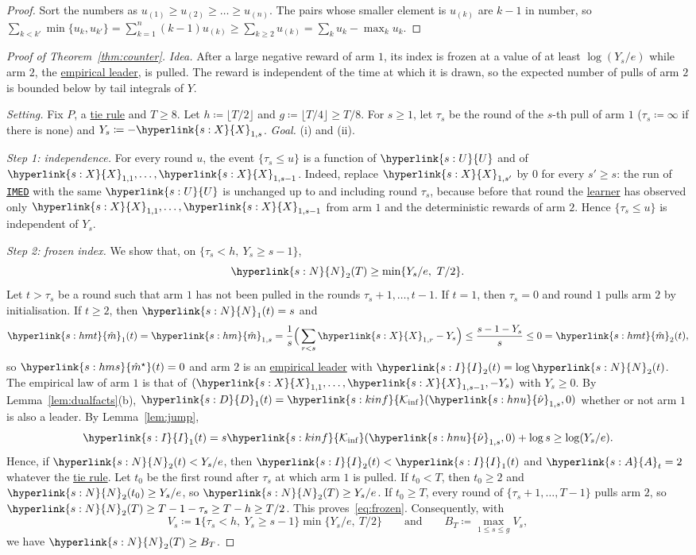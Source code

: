 \documentclass[11pt]{article}
\newcommand{\ind}{\mathbf{1}}
\newcommand{\sy}[2]{{\hyperlink{#1}{#2}}}
\newcommand{\term}[2]{\hyperlink{#1}{#2}}
\newcommand{\imed}{\hyperref[alg:imed]{\texttt{IMED}}}
\newcommand{\Kinf}{\sy{s:kinf}{\mathcal{K}_{\inf}}}
\newcommand{\Xs}{\sy{s:X}{X}}
\newcommand{\Useed}{\sy{s:U}{U}}
\newcommand{\Ap}{\sy{s:A}{A}}
\newcommand{\Np}{\sy{s:N}{N}}
\newcommand{\hnu}{\sy{s:hnu}{\hat{\nu}}}
\newcommand{\hm}{\sy{s:hm}{\hat{m}}}
\newcommand{\hmt}{\sy{s:hmt}{\hat{m}}}
\newcommand{\hms}{\sy{s:hms}{\hat{m}^{\star}}}
\newcommand{\Dv}{\sy{s:D}{D}}
\newcommand{\Ix}{\sy{s:I}{I}}
\begin{document}
\begin{proof}
Sort the numbers as $u_{(1)}\ge u_{(2)}\ge\dots\ge u_{(n)}$. The pairs whose smaller element is
$u_{(k)}$ are $k-1$ in number, so
$\sum_{k<k'}\min\{u_k,u_{k'}\}=\sum_{k=1}^n(k-1)u_{(k)}\ge\sum_{k\ge2}u_{(k)}=\sum_ku_k-\max_ku_k$.
\end{proof}

\begin{proof}[Proof of Theorem~\ref{thm:counter}]
\emph{Idea.} After a large negative reward of arm $1$, its index is frozen at a value of at least
$\log(Y_s/e)$ while arm $2$, the \term{w:leader}{empirical leader}, is pulled. The reward is independent of the
time at which it is drawn, so the expected number of pulls of arm $2$ is bounded below by tail
integrals of $Y$.

\emph{Setting.} Fix $P$, a \term{w:tie}{tie rule} and $T\ge8$. Let $h\coloneqq\lfloor T/2\rfloor$ and
$g\coloneqq\lfloor T/4\rfloor\ge T/8$. For $s\ge1$, let $\tau_s$ be the round of the $s$-th pull of
arm $1$ ($\tau_s\coloneqq\infty$ if there is none) and $Y_s\coloneqq-\Xs_{1,s}$. \emph{Goal.} (i) and (ii).

\emph{Step 1: independence.} For every round $u$, the event $\{\tau_s\le u\}$ is a function of $\Useed$
and of $\Xs_{1,1},\dots,\Xs_{1,s-1}$. Indeed, replace $\Xs_{1,s'}$ by $0$ for every $s'\ge s$: the run of
\imed{} with the same $\Useed$ is unchanged up to and including round $\tau_s$, because before that round
the \term{w:learner}{learner} has observed only $\Xs_{1,1},\dots,\Xs_{1,s-1}$ from arm $1$ and the deterministic rewards
of arm $2$. Hence $\{\tau_s\le u\}$ is independent of $Y_s$.

\emph{Step 2: frozen index.} We show that, on $\{\tau_s<h,\ Y_s\ge s-1\}$,
\begin{equation}\label{eq:frozen}
  \Np_2(T)\ge\min\{Y_s/e,\ T/2\}.
\end{equation}
Let $t>\tau_s$ be a round such that arm $1$ has not been pulled in the rounds $\tau_s+1,\dots,t-1$.
If $t=1$, then $\tau_s=0$ and round $1$ pulls arm $2$ by initialisation. If $t\ge2$, then
$\Np_1(t)=s$ and
\[
  \hmt_1(t)=\hm_{1,s}=\frac1s\Big(\sum_{r<s}\Xs_{1,r}-Y_s\Big)\le\frac{s-1-Y_s}{s}\le0=\hmt_2(t),
\]
so $\hms(t)=0$ and arm $2$ is an \term{w:leader}{empirical leader} with $\Ix_2(t)=\log \Np_2(t)$. The empirical law
of arm $1$ is that of $(\Xs_{1,1},\dots,\Xs_{1,s-1},-Y_s)$ with $Y_s\ge0$. By
Lemma~\ref{lem:dualfacts}(b), $\Dv_1(t)=\Kinf(\hnu_{1,s},0)$ whether or not arm $1$ is also a leader.
By Lemma~\ref{lem:jump},
\[
  \Ix_1(t)=s\Kinf(\hnu_{1,s},0)+\log s\ge\log(Y_s/e).
\]
Hence, if $\Np_2(t)<Y_s/e$, then $\Ix_2(t)<\Ix_1(t)$ and $\Ap_t=2$ whatever the \term{w:tie}{tie rule}. Let $t_0$ be the
first round after $\tau_s$ at which arm $1$ is pulled. If $t_0<T$, then $t_0\ge2$ and
$\Np_2(t_0)\ge Y_s/e$, so $\Np_2(T)\ge Y_s/e$. If $t_0\ge T$, every round of
$\{\tau_s+1,\dots,T-1\}$ pulls arm $2$, so $\Np_2(T)\ge T-1-\tau_s\ge T-h\ge T/2$. This
proves~\eqref{eq:frozen}. Consequently, with
\[
  V_s\coloneqq\ind\{\tau_s<h,\ Y_s\ge s-1\}\min\{Y_s/e,\ T/2\}\qquad\text{and}\qquad B_T\coloneqq\max_{1\le s\le g}V_s,
\]
we have $\Np_2(T)\ge B_T$.


\end{proof}
\end{document}
